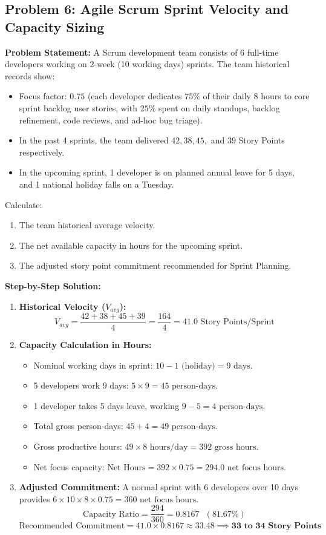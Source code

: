 \subsection*{Problem 6: Agile Scrum Sprint Velocity and Capacity Sizing}
\textbf{Problem Statement:} A Scrum development team consists of 6 full-time developers working on 2-week (10 working days) sprints. The team historical records show:
\begin{itemize}
    \item Focus factor: $0.75$ (each developer dedicates $75\%$ of their daily 8 hours to core sprint backlog user stories, with $25\%$ spent on daily standups, backlog refinement, code reviews, and ad-hoc bug triage).
    \item In the past 4 sprints, the team delivered $42, 38, 45,$ and $39$ Story Points respectively.
    \item In the upcoming sprint, 1 developer is on planned annual leave for 5 days, and 1 national holiday falls on a Tuesday.
\end{itemize}
Calculate:
\begin{enumerate}[label=(\alph*)]
    \item The team historical average velocity.
    \item The net available capacity in hours for the upcoming sprint.
    \item The adjusted story point commitment recommended for Sprint Planning.
\end{enumerate}

\textbf{Step-by-Step Solution:}
\begin{enumerate}[label=(\alph*)]
    \item \textbf{Historical Velocity ($V_{avg}$):}
    \[
    V_{avg} = \frac{42 + 38 + 45 + 39}{4} = \frac{164}{4} = 41.0\text{ Story Points/Sprint}
    \]
    \item \textbf{Capacity Calculation in Hours:}
    \begin{itemize}
        \item Nominal working days in sprint: $10 - 1\text{ (holiday)} = 9\text{ days}$.
        \item 5 developers work 9 days: $5 \times 9 = 45\text{ person-days}$.
        \item 1 developer takes 5 days leave, working $9 - 5 = 4\text{ person-days}$.
        \item Total gross person-days: $45 + 4 = 49\text{ person-days}$.
        \item Gross productive hours: $49 \times 8\text{ hours/day} = 392\text{ gross hours}$.
        \item Net focus capacity: $\text{Net Hours} = 392 \times 0.75 = 294.0\text{ net focus hours}$.
    \end{itemize}
    \item \textbf{Adjusted Commitment:}
    A normal sprint with 6 developers over 10 days provides $6 \times 10 \times 8 \times 0.75 = 360\text{ net focus hours}$.
    \[
    \text{Capacity Ratio} = \frac{294}{360} = 0.8167\text{ } (81.67\%)
    \]
    \[
    \text{Recommended Commitment} = 41.0 \times 0.8167 \approx 33.48 \implies \mathbf{33\text{ to }34\text{ Story Points}}
    \]
\end{enumerate}

